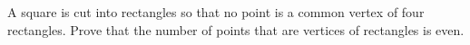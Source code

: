 A square is cut into rectangles so that no point is a common vertex of four rectangles. Prove that the number of points that are vertices of rectangles is even.
